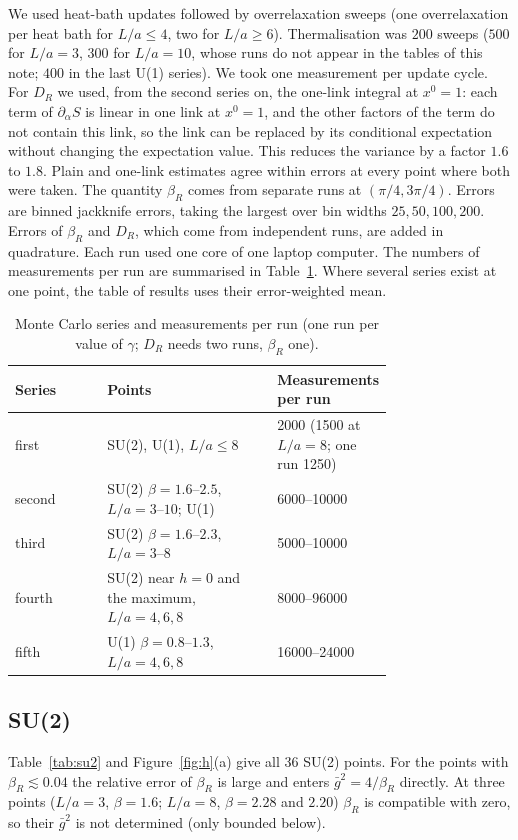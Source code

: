 \documentclass[11pt,a4paper]{article}
\theoremstyle{definition}
\theoremstyle{remark}
\newcommand{\gb}{\bar g^{2}}
\newcommand{\bR}{\beta_R}
\newcommand{\DR}{D_R}
\begin{document}
We used heat-bath updates followed by overrelaxation sweeps (one overrelaxation per heat bath for $L/a\le4$, two for $L/a\ge6$). Thermalisation was $200$ sweeps ($500$ for $L/a=3$, $300$ for $L/a=10$, whose runs do not appear in the tables of this note; $400$ in the last U(1) series). We took one measurement per update cycle. For $\DR$ we used, from the second series on, the one-link integral at $x^0=1$: each term of $\partial_\alpha S$ is linear in one link at $x^0=1$, and the other factors of the term do not contain this link, so the link can be replaced by its conditional expectation without changing the expectation value. This reduces the variance by a factor $1.6$ to $1.8$. Plain and one-link estimates agree within errors at every point where both were taken. The quantity $\bR$ comes from separate runs at $(\pi/4,3\pi/4)$. Errors are binned jackknife errors, taking the largest over bin widths $25,50,100,200$. Errors of $\bR$ and $\DR$, which come from independent runs, are added in quadrature. Each run used one core of one laptop computer. The numbers of measurements per run are summarised in Table~\ref{tab:stats}. Where several series exist at one point, the table of results uses their error-weighted mean.

\begin{table}[ht]\centering\small
\caption{Monte Carlo series and measurements per run (one run per value of $\gamma$; $\DR$ needs two runs, $\bR$ one).}\label{tab:stats}
\begin{tabular}{@{}lp{0.45\linewidth}p{0.30\linewidth}@{}}\toprule
Series & Points & Measurements per run\\\midrule
first & SU(2), U(1), $L/a\le8$ & 2000 (1500 at $L/a=8$; one run 1250)\\
second & SU(2) $\beta=1.6$--$2.5$, $L/a=3$--$10$; U(1) & 6000--10000\\
third & SU(2) $\beta=1.6$--$2.3$, $L/a=3$--$8$ & 5000--10000\\
fourth & SU(2) near $h=0$ and the maximum, $L/a=4,6,8$ & 8000--96000\\
fifth & U(1) $\beta=0.8$--$1.3$, $L/a=4,6,8$ & 16000--24000\\\bottomrule
\end{tabular}
\end{table}

\subsection{SU(2)}

Table~\ref{tab:su2} and Figure~\ref{fig:h}(a) give all 36 SU(2) points. For the points with $\bR\lesssim0.04$ the relative error of $\bR$ is large and enters $\gb=4/\bR$ directly. At three points ($L/a=3$, $\beta=1.6$; $L/a=8$, $\beta=2.28$ and $2.20$) $\bR$ is compatible with zero, so their $\gb$ is not determined (only bounded below).
\end{document}
